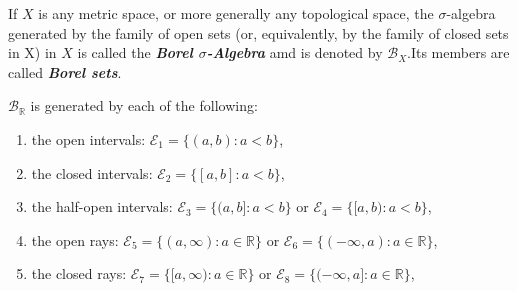 If $X$ is any metric space, or more generally any topological space, the $\sigma$-algebra generated by the family of open sets (or, equivalently, by the family of closed sets in X) in $X$ is called the \textbf{\textsl{Borel $\sigma$-Algebra}} amd is denoted by $\mathcal{B}_{X}$.Its members are called \textbf{\textsl{Borel sets}}.

\begin{question}
    $\mathcal{B}_{\mathbb{R}}$ is generated by each of the following:
        \begin{enumerate}[itemindent=2em]
            \item the open intervals: $\mathcal{E}_1=\{(a,b):a<b\}$,
            \item the closed intervals: $\mathcal{E}_2=\{[a,b]:a<b\}$,
            \item the half-open intervals: $\mathcal{E}_3=\{(a,b]:a<b\}$ or $\mathcal{E}_4=\{[a,b):a<b\}$,
            \item the open rays: $\mathcal{E}_5=\{(a,\infty):a\in \mathbb{R}\}$ or $\mathcal{E}_6=\{(-\infty,a):a\in \mathbb{R}\}$,
            \item the closed rays: $\mathcal{E}_7=\{[a,\infty):a\in \mathbb{R}\}$ or $\mathcal{E}_8=\{(-\infty,a]:a\in \mathbb{R}\}$,
        \end{enumerate}
\end{question}

